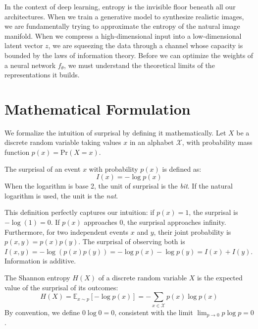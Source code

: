 In the context of deep learning, entropy is the invisible floor beneath all our architectures. When we train a generative model to synthesize realistic images, we are fundamentally trying to approximate the entropy of the natural image manifold. When we compress a high-dimensional input into a low-dimensional latent vector $z$, we are squeezing the data through a channel whose capacity is bounded by the laws of information theory. Before we can optimize the weights of a neural network $f_\theta$, we must understand the theoretical limits of the representations it builds.

\section{Mathematical Formulation}

We formalize the intuition of surprisal by defining it mathematically. Let $X$ be a discrete random variable taking values $x$ in an alphabet $\mathcal{X}$, with probability mass function $p(x) = \text{Pr}(X = x)$.

\begin{definition}
The surprisal of an event $x$ with probability $p(x)$ is defined as:
\begin{equation}
    I(x) = -\log p(x)
\end{equation}
When the logarithm is base 2, the unit of surprisal is the \textit{bit}. If the natural logarithm is used, the unit is the \textit{nat}.
\end{definition}

This definition perfectly captures our intuition: if $p(x) = 1$, the surprisal is $-\log(1) = 0$. If $p(x)$ approaches 0, the surprisal approaches infinity. Furthermore, for two independent events $x$ and $y$, their joint probability is $p(x,y) = p(x)p(y)$. The surprisal of observing both is $I(x,y) = -\log(p(x)p(y)) = -\log p(x) - \log p(y) = I(x) + I(y)$. Information is additive.

\begin{definition}
The Shannon entropy $H(X)$ of a discrete random variable $X$ is the expected value of the surprisal of its outcomes:
\begin{equation}
    H(X) = \mathbb{E}_{x \sim p}[-\log p(x)] = -\sum_{x \in \mathcal{X}} p(x) \log p(x)
\end{equation}
By convention, we define $0 \log 0 = 0$, consistent with the limit $\lim_{p \to 0} p \log p = 0$.
\end{definition}

